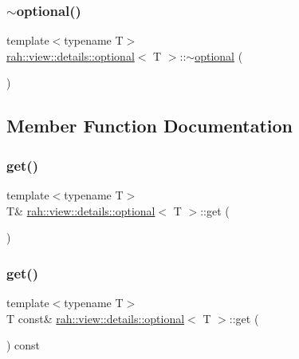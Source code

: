 \subsubsection{\texorpdfstring{$\sim$optional()}{~optional()}}
{\footnotesize\ttfamily template$<$typename T$>$ \\
\mbox{\hyperlink{structrah_1_1view_1_1details_1_1optional}{rah\+::view\+::details\+::optional}}$<$ T $>$\+::$\sim$\mbox{\hyperlink{structrah_1_1view_1_1details_1_1optional}{optional}} (\begin{DoxyParamCaption}{ }\end{DoxyParamCaption})\hspace{0.3cm}{\ttfamily [inline]}}



\subsection{Member Function Documentation}
\mbox{\label{structrah_1_1view_1_1details_1_1optional_aec59d2702d103ac361def945f46b626b}} 
\subsubsection{\texorpdfstring{get()}{get()}\hspace{0.1cm}{\footnotesize\ttfamily [1/2]}}
{\footnotesize\ttfamily template$<$typename T$>$ \\
T\& \mbox{\hyperlink{structrah_1_1view_1_1details_1_1optional}{rah\+::view\+::details\+::optional}}$<$ T $>$\+::get (\begin{DoxyParamCaption}{ }\end{DoxyParamCaption})\hspace{0.3cm}{\ttfamily [inline]}}

\mbox{\label{structrah_1_1view_1_1details_1_1optional_aebb289247c0fac033c260b18c492ffec}} 
\subsubsection{\texorpdfstring{get()}{get()}\hspace{0.1cm}{\footnotesize\ttfamily [2/2]}}
{\footnotesize\ttfamily template$<$typename T$>$ \\
T const\& \mbox{\hyperlink{structrah_1_1view_1_1details_1_1optional}{rah\+::view\+::details\+::optional}}$<$ T $>$\+::get (\begin{DoxyParamCaption}{ }\end{DoxyParamCaption}) const\hspace{0.3cm}{\ttfamily [inline]}}

